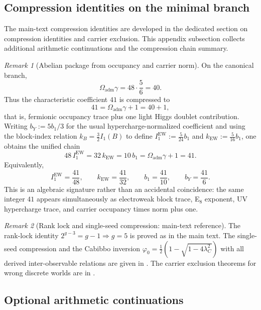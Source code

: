 \documentclass[11pt,a4paper]{article}
\theoremstyle{definition}
\theoremstyle{remark}
\newtheorem*{remark}{Remark}
\newcommand{\phiz}{\varphi_0}
\newcommand{\bone}{b_1}
\newcommand{\Oadm}{\Omega_{\mathrm{adm}}}
\begin{document}
\subsection{Compression identities on the minimal branch}

The main-text compression identities are developed in the dedicated section on compression identities and carrier exclusion. This appendix subsection collects additional arithmetic continuations and the compression chain summary.

\begin{remark}[Abelian package from occupancy and carrier norm]
On the canonical branch,
\[
\Oadm\gamma=48\cdot\frac56=40.
\]
Thus the characteristic coefficient $41$ is compressed to
\[
41=\Oadm\gamma+1=40+1,
\]
that is, fermionic occupancy trace plus one light Higgs doublet contribution.
Writing $b_Y:=5\bone/3$ for the usual hypercharge-normalized coefficient and using the block-index relation $k_B=\frac32 I_1(B)$ to define $I_1^{\mathrm{EW}}:=\frac{5}{24}\bone$ and $k_{\mathrm{EW}}:=\frac{5}{16}\bone$, one obtains the unified chain
\begin{equation}
\label{eq:41-chain}
48\,I_1^{\mathrm{EW}}
=32\,k_{\mathrm{EW}}
=10\,\bone
=\Oadm\gamma+1
=41.
\end{equation}
Equivalently,
\[
I_1^{\mathrm{EW}}=\frac{41}{48},
\qquad
k_{\mathrm{EW}}=\frac{41}{32},
\qquad
\bone=\frac{41}{10},
\qquad
b_Y=\frac{41}{6}.
\]
This is an algebraic signature rather than an accidental coincidence: the same integer $41$ appears simultaneously as electroweak block trace, E$_8$ exponent, UV hypercharge trace, and carrier occupancy times norm plus one.
\end{remark}

\begin{remark}[Rank lock and single-seed compression: main-text reference]
The rank-lock identity $2^{g-3}=g-1\Rightarrow g=5$ is proved as  in the main text.
The single-seed compression and the Cabibbo inversion $\phiz=\frac12(1-\sqrt{1-4\lambda_C^2})$ with all derived inter-observable relations are given in . The carrier exclusion theorems for wrong discrete worlds are in .
\end{remark}

\subsection{Optional arithmetic continuations}
\end{document}
